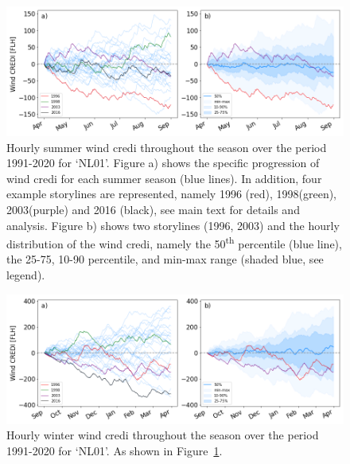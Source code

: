 \documentclass[a4paper,11pt]{extarticle}
\newcommand{\ts}[1]{\textsuperscript{#1}}
\newcommand{\wdi}[0]{{\sc wind credi}}
\begin{document}
\begin{figure}[h]
    \centering
    \includegraphics[width=\textwidth]{WindCREDI_seasonal-summer}
    \caption{
    Hourly summer \wdi{} throughout the season over the period 1991-2020 for `NL01'.
    Figure a) shows the specific progression of \wdi{} for each summer season (blue lines).
    In addition, four example storylines are represented, namely 1996 (red), 1998(green), 2003(purple) and 2016 (black), see main text for details and analysis.
    Figure b) shows two storylines (1996, 2003) and the hourly distribution of the \wdi{}, namely the 50\ts{th} percentile (blue line), the 25-75, 10-90 percentile, and min-max range (shaded blue, see legend). 
    }
    \label{SIfig:analysis_season-summer_wind}
\end{figure}
\begin{figure}[b!]
    \centering
    \includegraphics[width=\textwidth]{WindCREDI_seasonal-winter}
    \caption{
    Hourly winter \wdi{} throughout the season over the period 1991-2020 for `NL01'.
    As shown in Figure~\ref{SIfig:analysis_season-summer_wind}.
    }
    \label{SIfig:analysis_season-winter_wind}
\end{figure}
\end{document}
